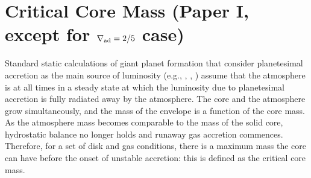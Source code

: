 \documentclass[apj]{emulateapj}
\newcommand{\delad}{\nabla_{\rm ad}}
\begin{document}

\section{Critical Core Mass \textbf{(Paper I, except for $\delad=2/5$ case)}}
\label{critical}


Standard static calculations of giant planet formation that consider planetesimal accretion as the main source of luminosity (e.g., \citealt{mizuno78}, \citealt{stevenson82}, \citealt{rafikov06}) assume that the atmosphere is at all times in a steady state at which the luminosity due to planetesimal accretion is fully radiated away by the atmosphere. The core and the atmosphere grow simultaneously, and the mass of the envelope is a function of the core mass. As the atmosphere mass becomes comparable to the mass of the solid core, hydrostatic balance no longer holds and runaway gas accretion commences. Therefore, for a set of disk and gas conditions, there is a maximum mass the core can have before the onset of unstable accretion: this is defined as the critical core mass. %
\end{document}
